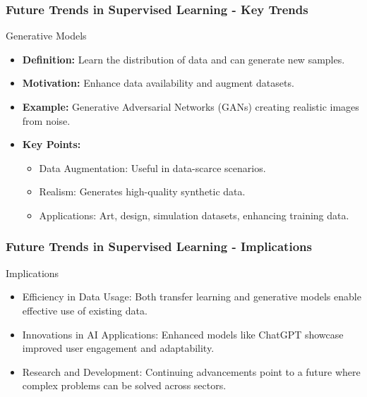 \documentclass[aspectratio=169]{beamer}
\begin{document}
\begin{frame}[fragile]
    \frametitle{Future Trends in Supervised Learning - Key Trends}
    \begin{block}{Generative Models}
        \begin{itemize}
            \item \textbf{Definition:} Learn the distribution of data and can generate new samples.
            \item \textbf{Motivation:} Enhance data availability and augment datasets.
            \item \textbf{Example:} Generative Adversarial Networks (GANs) creating realistic images from noise.
        \end{itemize}
        
        \begin{itemize}
            \item \textbf{Key Points:}
                \begin{itemize}
                    \item Data Augmentation: Useful in data-scarce scenarios.
                    \item Realism: Generates high-quality synthetic data.
                    \item Applications: Art, design, simulation datasets, enhancing training data.
                \end{itemize}
        \end{itemize}
    \end{block}
\end{frame}

\begin{frame}[fragile]
    \frametitle{Future Trends in Supervised Learning - Implications}
    \begin{block}{Implications}
        \begin{itemize}
            \item Efficiency in Data Usage: Both transfer learning and generative models enable effective use of existing data.
            \item Innovations in AI Applications: Enhanced models like ChatGPT showcase improved user engagement and adaptability.
            \item Research and Development: Continuing advancements point to a future where complex problems can be solved across sectors.
        \end{itemize}
    \end{block}
\end{frame}
\end{document}
